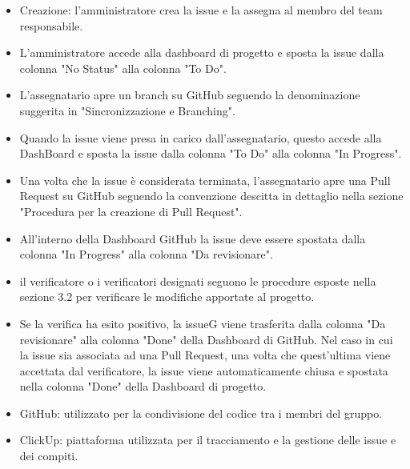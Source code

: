 \begin{itemize}
    \item Creazione: l’amministratore crea la issue e la assegna al membro del team responsabile.
    \item L’amministratore accede alla dashboard di progetto e sposta la issue dalla colonna "No Status" alla colonna "To Do".
    \item L’assegnatario apre un branch su GitHub seguendo la denominazione suggerita in "Sincronizzazione e Branching".
    \item Quando la issue viene presa in carico dall’assegnatario, questo accede alla DashBoard e sposta la issue dalla colonna "To Do" alla colonna "In Progress".
    \item Una volta che la issue è considerata terminata, l’assegnatario apre una Pull Request su GitHub seguendo la convenzione descitta in dettaglio nella sezione "Procedura per la creazione di Pull Request".
    \item All’interno della Dashboard GitHub la issue deve essere spostata dalla colonna "In Progress" alla colonna "Da revisionare".
    \item il verificatore o i verificatori designati seguono le procedure esposte nella sezione 3.2 per verificare le modifiche apportate al progetto.
    \item Se la verifica ha esito positivo, la issueG viene trasferita dalla colonna "Da revisionare" alla colonna "Done" della Dashboard di GitHub. Nel caso in cui la issue sia associata ad una Pull Request, una volta che quest’ultima viene accettata dal verificatore, la issue viene automaticamente chiusa e spostata nella colonna "Done" della Dashboard di progetto.
\end{itemize}
\begin{itemize}
    \item GitHub: utilizzato per la condivisione del codice tra i membri del gruppo.
    \item ClickUp: piattaforma utilizzata per il tracciamento e la gestione delle issue e dei compiti.
\end{itemize}
